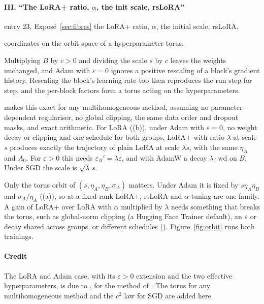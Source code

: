 \paragraph{III. ``The LoRA+ ratio, $\alpha$, the init scale, rsLoRA''}

\begin{example*}{entry 23, Exposé~\ref{sec:fibres}}
\enspace the LoRA+ ratio, $\alpha$, the initial scale, rsLoRA.\par
\noindent{}\enspace coordinates on the orbit space of a
hyperparameter torus.
\end{example*}

Multiplying $B$ by $c>0$ and dividing the scale $s$ by $c$ leaves the weights unchanged, and Adam with $\varepsilon=0$
ignores a positive rescaling of a block's gradient history. Rescaling the block's learning rate too then reproduces the
run step for step, and the per-block factors form a torus acting on the hyperparameters.

 makes this exact for any multihomogeneous method, assuming no parameter-dependent regulariser,
no global clipping, the same data order and dropout masks, and exact arithmetic. For LoRA
((b)), under Adam with $\varepsilon=0$, no weight decay or clipping and one schedule for both
groups, LoRA+ with ratio $\lambda$ at scale $s$ produces exactly the trajectory of plain LoRA at scale $\lambda s$, with
the same $\eta_A$ and $A_0$. For $\varepsilon>0$ this needs $\varepsilon_B'=\lambda\varepsilon$, and with AdamW a decay
$\lambda\cdot\mathrm{wd}$ on $B$. Under SGD the scale is $\sqrt\lambda\,s$.

\begin{explains}
Only the torus orbit of $(s,\eta_A,\eta_B,\sigma_A)$ matters. Under Adam it is fixed by $s\eta_A\eta_B$ and
$\sigma_A/\eta_A$ ((a)), so at a fixed rank LoRA+, rsLoRA and $\alpha$-tuning are one family. A
gain of LoRA+ over LoRA with $\alpha$ multiplied by $\lambda$ needs something that breaks the torus, such as global-norm
clipping (a Hugging Face Trainer default), an $\varepsilon$ or decay shared across groups, or different schedules
(). Figure~\ref{fig:orbit} runs both trainings.
\end{explains}

\paragraph{Credit}
The LoRA and Adam case, with its $\varepsilon>0$ extension and the two effective hyperparameters, is due to
\citet{schulman2025lora}, for the method of \citet{hayou2024lora}. The torus for any multihomogeneous method and the
$c^2$ law for SGD are added here.

